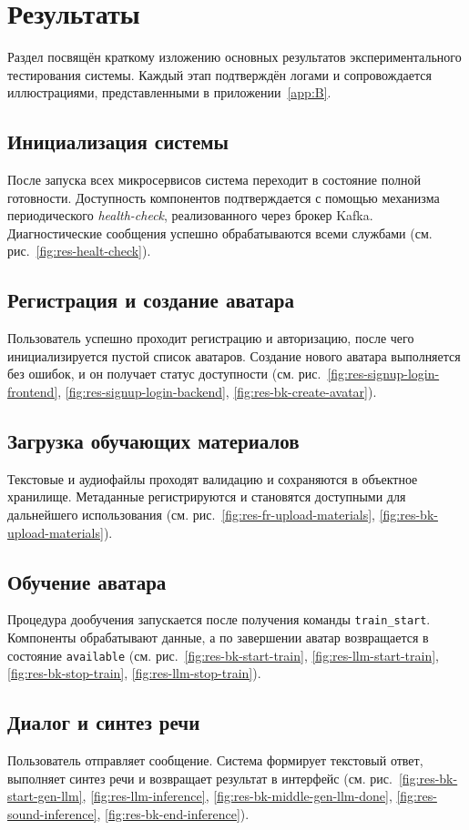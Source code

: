 \chapter{Результаты}

Раздел посвящён краткому изложению основных результатов
экспериментального тестирования системы. Каждый этап
подтверждён логами и сопровождается иллюстрациями,
представленными в приложении~\ref{app:B}.

\section{Инициализация системы}

После запуска всех микросервисов система переходит в состояние
полной готовности. Доступность компонентов подтверждается с
помощью механизма периодического \textit{health-check},
реализованного через брокер Kafka. Диагностические сообщения
успешно обрабатываются всеми службами (см.
рис.~\ref{fig:res-healt-check}).

\section{Регистрация и создание аватара}

Пользователь успешно проходит регистрацию и авторизацию,
после чего инициализируется пустой список аватаров.
Создание нового аватара выполняется без ошибок, и он
получает статус доступности (см.
рис.~\ref{fig:res-signup-login-frontend},
\ref{fig:res-signup-login-backend},
\ref{fig:res-bk-create-avatar}).

\section{Загрузка обучающих материалов}

Текстовые и аудиофайлы проходят валидацию и сохраняются
в объектное хранилище. Метаданные регистрируются и становятся
доступными для дальнейшего использования (см.
рис.~\ref{fig:res-fr-upload-materials},
\ref{fig:res-bk-upload-materials}).

\section{Обучение аватара}

Процедура дообучения запускается после получения команды
\texttt{train\_start}. Компоненты обрабатывают данные, а
по завершении аватар возвращается в состояние
\texttt{available} (см. рис.~\ref{fig:res-bk-start-train},
\ref{fig:res-llm-start-train},
\ref{fig:res-bk-stop-train},
\ref{fig:res-llm-stop-train}).

\section{Диалог и синтез речи}

Пользователь отправляет сообщение. Система формирует
текстовый ответ, выполняет синтез речи и возвращает
результат в интерфейс (см. рис.~\ref{fig:res-bk-start-gen-llm},
\ref{fig:res-llm-inference},
\ref{fig:res-bk-middle-gen-llm-done},
\ref{fig:res-sound-inference},
\ref{fig:res-bk-end-inference}).
